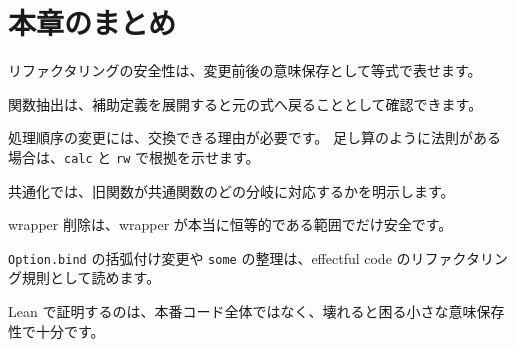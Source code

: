 \section{本章のまとめ}

リファクタリングの安全性は、変更前後の意味保存として等式で表せます。

関数抽出は、補助定義を展開すると元の式へ戻ることとして確認できます。

処理順序の変更には、交換できる理由が必要です。
足し算のように法則がある場合は、\texttt{calc} と \texttt{rw} で根拠を示せます。

共通化では、旧関数が共通関数のどの分岐に対応するかを明示します。

wrapper 削除は、wrapper が本当に恒等的である範囲でだけ安全です。

\texttt{Option.bind} の括弧付け変更や \texttt{some} の整理は、effectful code のリファクタリング規則として読めます。

Lean で証明するのは、本番コード全体ではなく、壊れると困る小さな意味保存性で十分です。
